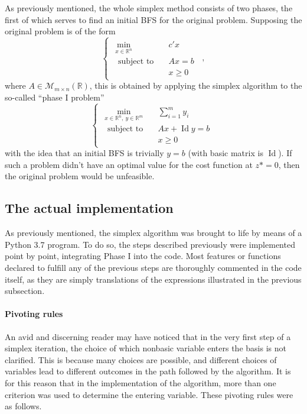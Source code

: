 \documentclass[a4paper]{article}
\DeclareMathOperator{\Id}{Id}
\begin{document}
As previously mentioned, the whole simplex method consists of two phases, the first of which serves to find an initial BFS for the original problem. Supposing the original problem is of the form
\begin{equation*}
\begin{cases}
\begin{aligned}
    \min\limits_{x\in\mathbb{R}^n} \quad &\! c'x\\[2ex]
    \text{ subject to}\quad
    &\! Ax = b\\
    &x \ge 0
\end{aligned}
\end{cases}
\,,
\end{equation*}
where $A\in\mathcal{M}_{m\times n}(\mathbb{R})$, this is obtained by applying the simplex algorithm to the so-called ``phase I problem''
\begin{equation*}
\begin{cases}
\begin{aligned}
    \min\limits_{x\in \mathbb{R}^n,\ y\in\mathbb{R}^m} \quad &\! \sum_{i = 1}^{m} y_i\\[2ex]
    \text{ subject to}\quad
    &\! Ax + \Id y = b\\
    &x \ge 0
\end{aligned}
\end{cases}
\end{equation*}
with the idea that an initial BFS is trivially $y = b$ (with basic matrix is $\Id$). If such a problem didn't have an optimal value for the cost function at ${z}{*}=0$, then the original problem would be unfeasible.

\subsection{The actual implementation}

As previously mentioned, the simplex algorithm was brought to life by means of a Python 3.7 program. To do so, the steps described previously were implemented point by point, integrating Phase I into the code. Most features or functions declared to fulfill any of the previous steps are thoroughly commented in the code itself, as they are simply translations of the expressions illustrated in the previous subsection.

\paragraph{Pivoting rules} An avid and discerning reader may have noticed that in the very first step of a simplex iteration, the choice of which nonbasic variable enters the basis is not clarified. This is because many choices are possible, and different choices of variables lead to different outcomes in the path followed by the algorithm. It is for this reason that in the implementation of the algorithm, more than one criterion was used to determine the entering variable. These pivoting rules were as follows.
\end{document}
